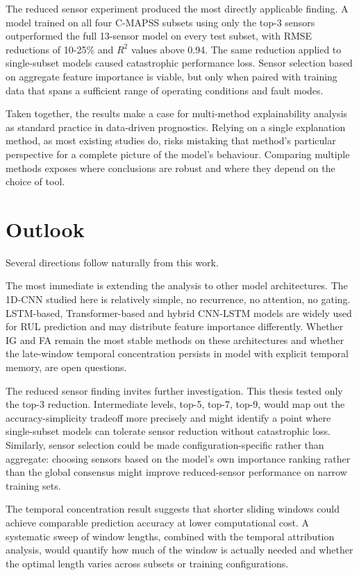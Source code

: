 The reduced sensor experiment produced the most directly applicable finding. A model trained on all four C-MAPSS subsets using only the top-3 sensors outperformed the full 13-sensor model on every test subset, with RMSE reductions of 10-25\% and $R^2$ values above 0.94. The same reduction applied to single-subset models caused catastrophic performance loss. Sensor selection based on aggregate feature importance is viable, but only when paired with training data that spans a sufficient range of operating conditions and fault modes. 

Taken together, the results make a case for multi-method explainability analysis as standard practice in data-driven prognostics. Relying on a single explanation method, as most existing studies do, risks mistaking that method's particular perspective for a complete picture of the model's behaviour. Comparing multiple methods exposes where conclusions are robust and where they depend on the choice of tool.

\section{Outlook}
Several directions follow naturally from this work.

The most immediate is extending the analysis to other model architectures. The 1D-CNN studied here is relatively simple, no recurrence, no attention, no gating. LSTM-based, Transformer-based and hybrid CNN-LSTM models are widely used for RUL prediction and may distribute feature importance differently. Whether IG and FA remain the most stable methods on these architectures and whether the late-window temporal concentration persists in model with explicit temporal memory, are open questions.

The reduced sensor finding invites further investigation. This thesis tested only the top-3 reduction. Intermediate levels, top-5, top-7, top-9, would map out the accuracy-simplicity tradeoff more precisely and might identify a point where single-subset models can tolerate sensor reduction without catastrophic loss. Similarly, sensor selection could be made configuration-specific rather than aggregate: choosing sensors based on the model's own importance ranking rather than the global consensus might improve reduced-sensor performance on narrow training sets.

The temporal concentration result suggests that shorter sliding windows could achieve comparable prediction accuracy at lower computational cost. A systematic sweep of window lengths, combined with the temporal attribution analysis, would quantify how much of the window is actually needed and whether the optimal length varies across subsets or training configurations.

